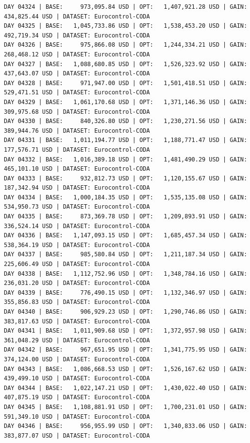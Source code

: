 \documentclass[11pt,a4paper]{article}
\begin{document}
\begin{verbatim}
DAY 04324 | BASE:     973,095.84 USD | OPT:   1,407,921.28 USD | GAIN: 434,825.44 USD | DATASET: Eurocontrol-CODA
DAY 04325 | BASE:   1,045,733.86 USD | OPT:   1,538,453.20 USD | GAIN: 492,719.34 USD | DATASET: Eurocontrol-CODA
DAY 04326 | BASE:     975,866.08 USD | OPT:   1,244,334.21 USD | GAIN: 268,468.12 USD | DATASET: Eurocontrol-CODA
DAY 04327 | BASE:   1,088,680.85 USD | OPT:   1,526,323.92 USD | GAIN: 437,643.07 USD | DATASET: Eurocontrol-CODA
DAY 04328 | BASE:     971,947.00 USD | OPT:   1,501,418.51 USD | GAIN: 529,471.51 USD | DATASET: Eurocontrol-CODA
DAY 04329 | BASE:   1,061,170.68 USD | OPT:   1,371,146.36 USD | GAIN: 309,975.68 USD | DATASET: Eurocontrol-CODA
DAY 04330 | BASE:     840,326.80 USD | OPT:   1,230,271.56 USD | GAIN: 389,944.76 USD | DATASET: Eurocontrol-CODA
DAY 04331 | BASE:   1,011,194.77 USD | OPT:   1,188,771.47 USD | GAIN: 177,576.71 USD | DATASET: Eurocontrol-CODA
DAY 04332 | BASE:   1,016,389.18 USD | OPT:   1,481,490.29 USD | GAIN: 465,101.10 USD | DATASET: Eurocontrol-CODA
DAY 04333 | BASE:     932,812.73 USD | OPT:   1,120,155.67 USD | GAIN: 187,342.94 USD | DATASET: Eurocontrol-CODA
DAY 04334 | BASE:   1,000,184.35 USD | OPT:   1,535,135.08 USD | GAIN: 534,950.73 USD | DATASET: Eurocontrol-CODA
DAY 04335 | BASE:     873,369.78 USD | OPT:   1,209,893.91 USD | GAIN: 336,524.14 USD | DATASET: Eurocontrol-CODA
DAY 04336 | BASE:   1,147,093.15 USD | OPT:   1,685,457.34 USD | GAIN: 538,364.19 USD | DATASET: Eurocontrol-CODA
DAY 04337 | BASE:     985,580.84 USD | OPT:   1,211,187.34 USD | GAIN: 225,606.49 USD | DATASET: Eurocontrol-CODA
DAY 04338 | BASE:   1,112,752.96 USD | OPT:   1,348,784.16 USD | GAIN: 236,031.20 USD | DATASET: Eurocontrol-CODA
DAY 04339 | BASE:     776,490.15 USD | OPT:   1,132,346.97 USD | GAIN: 355,856.83 USD | DATASET: Eurocontrol-CODA
DAY 04340 | BASE:     906,929.23 USD | OPT:   1,290,746.86 USD | GAIN: 383,817.63 USD | DATASET: Eurocontrol-CODA
DAY 04341 | BASE:   1,011,909.68 USD | OPT:   1,372,957.98 USD | GAIN: 361,048.29 USD | DATASET: Eurocontrol-CODA
DAY 04342 | BASE:     967,651.95 USD | OPT:   1,341,775.95 USD | GAIN: 374,124.00 USD | DATASET: Eurocontrol-CODA
DAY 04343 | BASE:   1,086,668.53 USD | OPT:   1,526,167.62 USD | GAIN: 439,499.10 USD | DATASET: Eurocontrol-CODA
DAY 04344 | BASE:   1,022,147.21 USD | OPT:   1,430,022.40 USD | GAIN: 407,875.19 USD | DATASET: Eurocontrol-CODA
DAY 04345 | BASE:   1,108,881.91 USD | OPT:   1,700,231.01 USD | GAIN: 591,349.10 USD | DATASET: Eurocontrol-CODA
DAY 04346 | BASE:     956,955.99 USD | OPT:   1,340,833.06 USD | GAIN: 383,877.07 USD | DATASET: Eurocontrol-CODA

\end{verbatim}
\end{document}

